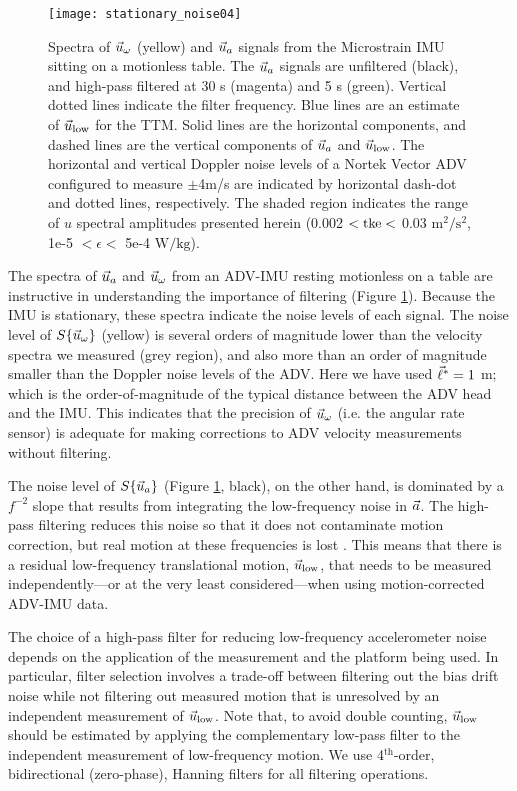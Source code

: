 \begin{figure}
  \centering
  \texttt{[image: stationary\_noise04]}
  \caption{Spectra of $\vec{u}_\omega$ (yellow) and $\vec{u}_a$ signals from the Microstrain IMU sitting on a motionless table. The $\vec{u}_a$ signals are unfiltered (black), and high-pass filtered at 30 s (magenta) and 5 s (green). Vertical dotted lines indicate the filter frequency.  Blue lines are an estimate of $\vec{u}_\mathrm{low}$ for the TTM. Solid lines are the horizontal components, and dashed lines are the vertical components of $\vec{u}_a$ and $\vec{u}_\mathrm{low}$. The horizontal and vertical Doppler noise levels of a Nortek Vector ADV configured to measure $\pm$4m/s are indicated by horizontal dash-dot and dotted lines, respectively. The shaded region indicates the range of $u$ spectral amplitudes presented herein (0.002 $< \mathrm{tke} <$ 0.03 $\mathrm{m^2/s^2}$, 1e-5 $< \epsilon <$ 5e-4 $\mathrm{W/kg}$).}
  \label{fig:stnoise}
\end{figure}

The spectra of $\vec{u}_a$ and $\vec{u}_\omega$ from an ADV-IMU resting motionless on a table are instructive in understanding the importance of filtering (Figure \ref{fig:stnoise}). Because the IMU is stationary, these spectra indicate the noise levels of each signal.  The noise level of $S\{\vec{u}_\omega\}$ (yellow) is several orders of magnitude lower than the velocity spectra we measured (grey region), and also more than an order of magnitude smaller than the Doppler noise levels of the ADV. Here we have used $\vec{\ell}^*=1$ m; which is the order-of-magnitude of the typical distance between the ADV head and the IMU. This indicates that the precision of $\vec{u}_\omega$ (i.e. the angular rate sensor) is adequate for making corrections to ADV velocity measurements without filtering.

The noise level of $S\{\vec{u}_a\}$ (Figure \ref{fig:stnoise}, black), on the other hand, is dominated by a $f^{-2}$ slope that results from integrating the low-frequency noise in ${\vec{a}}$. The high-pass filtering reduces this noise so that it does not contaminate motion correction, but real motion at these frequencies is lost \cite[]{EgelandPhD2014, VanZwieten++2015}. This means that there is a residual low-frequency translational motion, $\vec{u}_\mathrm{low}$, that needs to be measured independently---or at the very least considered---when using motion-corrected ADV-IMU data. 

The choice of a high-pass filter for reducing low-frequency accelerometer noise depends on the application of the measurement and the platform being used. In particular, filter selection involves a trade-off between filtering out the bias drift noise while not filtering out measured motion that is unresolved by an independent measurement of $\vec{u}_\mathrm{low}$. Note that, to avoid double counting, $\vec{u}_\mathrm{low}$ should be estimated by applying the complementary low-pass filter to the independent measurement of low-frequency motion. We use 4$^\mathrm{th}$-order, bidirectional (zero-phase), Hanning filters for all filtering operations. 

